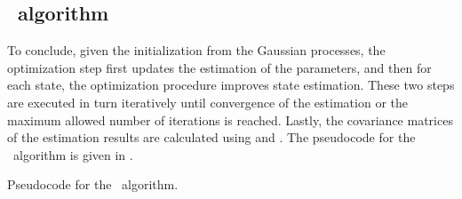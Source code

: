 \subsection*{\algolpmf\ algorithm}

To conclude, given the initialization from the Gaussian processes, the optimization step  first updates the estimation of the parameters, and then for each state, the optimization procedure  improves state estimation.
These two steps are executed in turn iteratively until convergence of the estimation or the maximum allowed number of iterations is reached.
Lastly, the covariance matrices of the estimation results are calculated using  and .
The pseudocode for the \algolpmf\ algorithm is given in .

\begin{algorithm}
    \centering
    \caption{Pseudocode for the \algolpmf\ algorithm.}
    \label{algo-lpmf}
    \begin{algorithmic}[1]
            \State 
            \State 
        \EndFor
        \State
            \State 

                \State 
            \EndFor                            
        \EndWhile
        \State
        \State
            \State
        \EndFor
    \end{algorithmic}
\end{algorithm}

